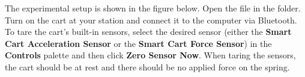 The experimental setup is shown in the figure below.
Open the file  in the \filename{\coursefolder} folder. Turn on the cart at your station and connect it to the computer via Bluetooth. To tare the cart's built-in sensors, select the desired sensor (either the \textbf{Smart Cart Acceleration Sensor} or the \textbf{Smart Cart Force Sensor}) in the \textbf{Controls} palette and then click \textbf{Zero Sensor Now}. When taring the sensors, the cart should be at rest and there should be no applied force on the spring. 
 

\vspace{0.3cm}
{\par\centering {} \par}
\vspace{0.3cm}

